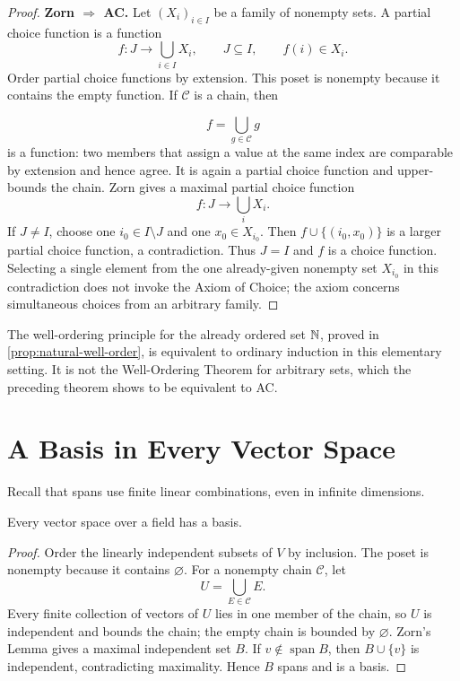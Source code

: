 \begin{proof}
\textbf{Zorn $\Rightarrow$ AC.}
Let $(X_i)_{i\in I}$ be a family of nonempty sets. A partial choice function
is a function
\[
f:J\longrightarrow\bigcup_{i\in I}X_i,
\qquad J\subseteq I,
\qquad f(i)\in X_i.
\]
Order partial choice functions by extension. This poset is nonempty because
it contains the empty function. If $\mathcal C$ is a chain, then

\[
f=\bigcup_{g\in\mathcal C}g
\]
 is a function: two members that assign a value
at the same index are comparable by extension and hence agree. It is again a
partial choice function and upper-bounds the chain. Zorn gives a maximal
partial choice function
\[
f:J\to\bigcup_iX_i.
\]
 If $J\ne I$, choose one
$i_0\in I\setminus J$ and one $x_0\in X_{i_0}$. Then
$f\cup\{(i_0,x_0)\}$ is a larger partial choice function, a contradiction.
Thus $J=I$ and $f$ is a choice function. Selecting a single element from
the one already-given nonempty set $X_{i_0}$ in this contradiction does not
invoke the Axiom of Choice; the axiom concerns simultaneous choices from an
arbitrary family.
\end{proof}

The well-ordering principle for the already ordered set $\mathbb{N}$, proved in
\cref{prop:natural-well-order}, is equivalent to ordinary induction in this
elementary setting. It is not the Well-Ordering Theorem for arbitrary sets,
which the preceding theorem shows to be equivalent to AC.

\section{A Basis in Every Vector Space}
Recall that spans use finite linear combinations, even in infinite dimensions.
\begin{theorem}\label{thm:zorn-basis}
Every vector space over a field has a basis.
\end{theorem}
\begin{proof}
Order the linearly independent subsets of \(V\) by inclusion. The poset is
nonempty because it contains \(\varnothing\). For a nonempty chain
\(\mathcal C\), let
\[
U=\bigcup_{E\in\mathcal C}E.
\]
 Every finite collection
of vectors of \(U\) lies in one member of the chain, so \(U\) is independent
and bounds the chain; the empty chain is bounded by \(\varnothing\). Zorn's
Lemma gives a maximal independent set \(B\). If
\(v\notin\operatorname{span}B\), then \(B\cup\{v\}\) is independent,
contradicting maximality. Hence \(B\) spans and is a basis.
\end{proof}

